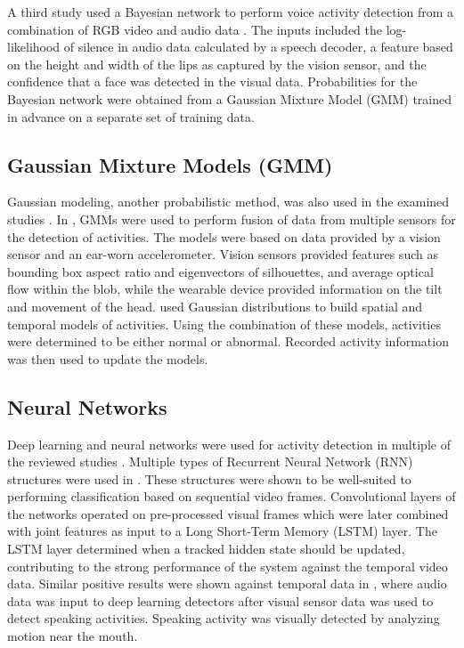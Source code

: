 \documentclass[12pt]{report}
\begin{document}
A third study used a Bayesian network to perform voice activity detection from a combination of RGB video and audio data \cite{Yoshida2010}. The inputs included the log-likelihood of silence in audio data calculated by a speech decoder, a feature based on the height and width of the lips as captured by the vision sensor, and the confidence that a face was detected in the visual data. Probabilities for the Bayesian network were obtained from a Gaussian Mixture Model (GMM) trained in advance on a separate set of training data.

\subsection{Gaussian Mixture Models (GMM)}

Gaussian modeling, another probabilistic method, was also used in the examined studies \cite{McIlwraith2008, ElHelw2009, Yiping2006}. In \cite{McIlwraith2008, ElHelw2009}, GMMs were used to perform fusion of data from multiple sensors for the detection of activities. The models were based on data provided by a vision sensor and an ear-worn accelerometer. Vision sensors provided features such as bounding box aspect ratio and eigenvectors of silhouettes, and average optical flow within the blob, while the wearable device provided information on the tilt and movement of the head. \cite{Yiping2006} used Gaussian distributions to build spatial and temporal models of activities. Using the combination of these models, activities were determined to be either normal or abnormal. Recorded activity information was then used to update the models. 

\subsection{Neural Networks}

Deep learning and neural networks were used for activity detection in multiple of the reviewed studies \cite{Li2016, Savran2018, GillaniFahad2013LongHome, Lu2019, Li, Wang2018}. Multiple types of Recurrent Neural Network (RNN) structures were used in \cite{Li2016}. These structures were shown to be well-suited to performing classification based on sequential video frames. Convolutional layers of the networks operated on pre-processed visual frames which were later combined with joint features as input to a Long Short-Term Memory (LSTM) layer. The LSTM layer determined when a tracked hidden state should be updated, contributing to the strong performance of the system against the temporal video data. Similar positive results were shown against temporal data in \cite{Savran2018}, where audio data was input to deep learning detectors after visual sensor data was used to detect speaking activities. Speaking activity was visually detected by analyzing motion near the mouth.
\end{document}
